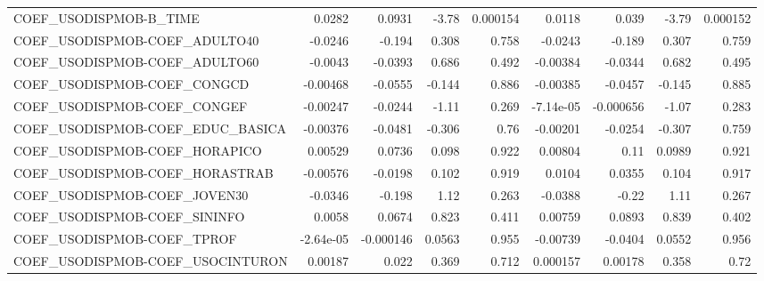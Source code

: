 \begin{tabular}{lrrrrrrrr}
COEF\_USODISPMOB-B\_TIME            &      0.0282 &       0.0931 &    -3.78 & 0.000154 &     0.0118 &       0.039 &        -3.79 &      0.000152 \\
COEF\_USODISPMOB-COEF\_ADULTO40     &     -0.0246 &       -0.194 &    0.308 &    0.758 &    -0.0243 &      -0.189 &        0.307 &         0.759 \\
COEF\_USODISPMOB-COEF\_ADULTO60     &     -0.0043 &      -0.0393 &    0.686 &    0.492 &   -0.00384 &     -0.0344 &        0.682 &         0.495 \\
COEF\_USODISPMOB-COEF\_CONGCD       &    -0.00468 &      -0.0555 &   -0.144 &    0.886 &   -0.00385 &     -0.0457 &       -0.145 &         0.885 \\
COEF\_USODISPMOB-COEF\_CONGEF       &    -0.00247 &      -0.0244 &    -1.11 &    0.269 &  -7.14e-05 &   -0.000656 &        -1.07 &         0.283 \\
COEF\_USODISPMOB-COEF\_EDUC\_BASICA  &    -0.00376 &      -0.0481 &   -0.306 &     0.76 &   -0.00201 &     -0.0254 &       -0.307 &         0.759 \\
COEF\_USODISPMOB-COEF\_HORAPICO     &     0.00529 &       0.0736 &    0.098 &    0.922 &    0.00804 &        0.11 &       0.0989 &         0.921 \\
COEF\_USODISPMOB-COEF\_HORASTRAB    &    -0.00576 &      -0.0198 &    0.102 &    0.919 &     0.0104 &      0.0355 &        0.104 &         0.917 \\
COEF\_USODISPMOB-COEF\_JOVEN30      &     -0.0346 &       -0.198 &     1.12 &    0.263 &    -0.0388 &       -0.22 &         1.11 &         0.267 \\
COEF\_USODISPMOB-COEF\_SININFO      &      0.0058 &       0.0674 &    0.823 &    0.411 &    0.00759 &      0.0893 &        0.839 &         0.402 \\
COEF\_USODISPMOB-COEF\_TPROF        &   -2.64e-05 &    -0.000146 &   0.0563 &    0.955 &   -0.00739 &     -0.0404 &       0.0552 &         0.956 \\
COEF\_USODISPMOB-COEF\_USOCINTURON  &     0.00187 &        0.022 &    0.369 &    0.712 &   0.000157 &     0.00178 &        0.358 &          0.72 \\
\bottomrule
\end{tabular}
